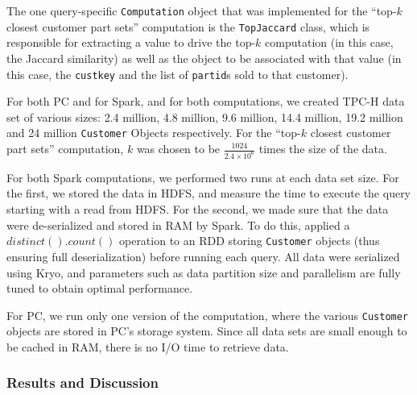 \noindent The one query-specific \texttt{Computation} object that was implemented for the ``top-$k$ 
closest customer part sets'' computation is the \texttt{TopJaccard} class, which
is responsible for extracting a value to drive the top-$k$ computation (in this case, the Jaccard similarity) as well
as the object to be associated with that value (in this case, the \texttt{custkey} and the list of 
\texttt{partid}s sold to that customer).

For both PC and for Spark, and for both computations, we created 
TPC-H data set of various sizes: 2.4 million,
4.8 million, 9.6 million, 14.4 million, 19.2 million and 24 million
\texttt{Customer} Objects respectively.  For the ``top-$k$
closest customer part sets'' computation, $k$ was chosen to be $\frac{1024}{2.4 \times 10^6}$ times the size
of the data.

For both Spark computations, we performed two runs at each data set size.
For the first, we stored the data in HDFS, and measure the time to execute the query starting with a
read from HDFS.
For the second, we made sure that the data were de-serialized and stored in RAM by Spark.
To do this, applied a $distinct().count()$ operation to
an RDD storing \texttt{Customer} objects (thus ensuring full deserialization) before running each query.
All data were
serialized using Kryo, and parameters such as data partition size and parallelism are fully tuned to obtain
optimal performance. 

For PC, we run only one version of the computation, where the various \texttt{Customer} objects are stored in
PC's storage system.  Since all data sets are small enough to be cached in RAM, there is no I/O time to
retrieve data.

\subsubsection{Results and Discussion}

